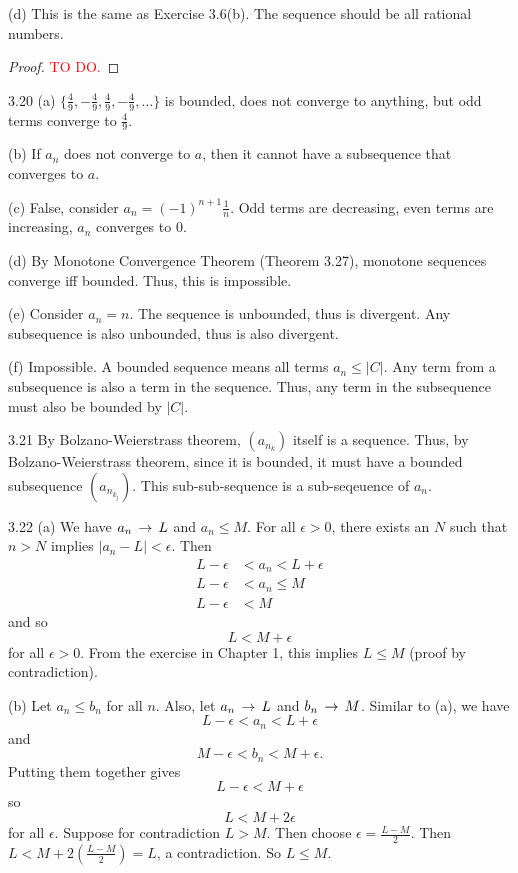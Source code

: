 (d) This is the same as Exercise 3.6(b). The sequence should be all rational numbers. 
\begin{proof}
    \textcolor{red}{TO DO.}
\end{proof}

3.20 (a) $\{\frac{4}{9},-\frac{4}{9},\frac{4}{9},-\frac{4}{9},\ldots\}$ is bounded, does not converge to anything, but odd terms converge to $\frac{4}{9}$.

(b) If $a_n$ does not converge to $a$, then it cannot have a subsequence that converges to $a$.

(c) False, consider $a_n=(-1)^{n+1}\frac{1}{n}$. Odd terms are decreasing, even terms are increasing, $a_n$ converges to $0$.

(d) By Monotone Convergence Theorem (Theorem 3.27), monotone sequences converge iff bounded. Thus, this is impossible.

(e) Consider $a_n = n$. The sequence is unbounded, thus is divergent. Any subsequence is also unbounded, thus is also divergent. 

(f) Impossible. A bounded sequence means all terms $a_n \leq |C|$. Any term from a subsequence is also a term in the sequence. Thus,
any term in the subsequence must also be bounded by $|C|$.

3.21 By Bolzano-Weierstrass theorem, $(a_{n_k})$ itself is a sequence. Thus, by Bolzano-Weierstrass theorem, since it is bounded, it must have a bounded subsequence $(a_{n_{k_j}})$. 
This sub-sub-sequence is a sub-seqeuence of $a_n$. 

3.22 (a) We have $a_n \,\rightarrow\, L$ and $a_n \leq M$. For all $\epsilon > 0$, there exists an $N$ such that $n > N$ implies $|a_n - L| < \epsilon$. Then 
\begin{align}
    L - \epsilon &< a_n < L + \epsilon \\
    L - \epsilon &< a_n \leq M \\
    L - \epsilon &< M
\end{align}
and so \[L < M + \epsilon\] for all $\epsilon > 0$. From the exercise in Chapter 1, this implies $L \leq M$ (proof by contradiction).

(b) Let $a_n \leq b_n$ for all $n$. Also, let $a_n \,\rightarrow\, L$ and $b_n \,\rightarrow\, M$. Similar to (a), we have
\[L - \epsilon < a_n < L + \epsilon\] and \[M - \epsilon < b_n < M + \epsilon.\]
Putting them together gives 
\[L - \epsilon < M + \epsilon\]
so
\[L < M + 2\epsilon\] for all $\epsilon$. Suppose for contradiction $L > M$. Then choose $\epsilon=\frac{L-M}{2}$.
Then $L < M + 2(\frac{L-M}{2}) = L$, a contradiction. So $L \leq M$.

